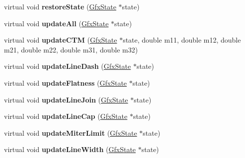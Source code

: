 \begin{DoxyCompactItemize}
virtual void {\bfseries restore\+State} (\hyperlink{class_gfx_state}{Gfx\+State} $\ast$state)
\item 
\mbox{\label{class_arthur_output_dev_a7810e0cf27dcd5e0e3de16ad1a9b95ee}} 
virtual void {\bfseries update\+All} (\hyperlink{class_gfx_state}{Gfx\+State} $\ast$state)
\item 
\mbox{\label{class_arthur_output_dev_a618d8642cb385ff78702d6fb0c039494}} 
virtual void {\bfseries update\+C\+TM} (\hyperlink{class_gfx_state}{Gfx\+State} $\ast$state, double m11, double m12, double m21, double m22, double m31, double m32)
\item 
\mbox{\label{class_arthur_output_dev_a091d74c85749043860eb5dd6bd71b669}} 
virtual void {\bfseries update\+Line\+Dash} (\hyperlink{class_gfx_state}{Gfx\+State} $\ast$state)
\item 
\mbox{\label{class_arthur_output_dev_a685917dd5f23bde65076010560ea3958}} 
virtual void {\bfseries update\+Flatness} (\hyperlink{class_gfx_state}{Gfx\+State} $\ast$state)
\item 
\mbox{\label{class_arthur_output_dev_ad66ee532f822b85d4b68d15f69d7a947}} 
virtual void {\bfseries update\+Line\+Join} (\hyperlink{class_gfx_state}{Gfx\+State} $\ast$state)
\item 
\mbox{\label{class_arthur_output_dev_a8db3317e524c7636739f6a967bfd68e9}} 
virtual void {\bfseries update\+Line\+Cap} (\hyperlink{class_gfx_state}{Gfx\+State} $\ast$state)
\item 
\mbox{\label{class_arthur_output_dev_a8d59dd14da5e18bd4b62954b56167211}} 
virtual void {\bfseries update\+Miter\+Limit} (\hyperlink{class_gfx_state}{Gfx\+State} $\ast$state)
\item 
\mbox{\label{class_arthur_output_dev_affb2218e59477080debeebc2a82ff8c6}} 
virtual void {\bfseries update\+Line\+Width} (\hyperlink{class_gfx_state}{Gfx\+State} $\ast$state)
\item 
\mbox{\label{class_arthur_output_dev_a38669e34bf20f72bdebe04a8232d8fb3}} 

\end{DoxyCompactItemize}
